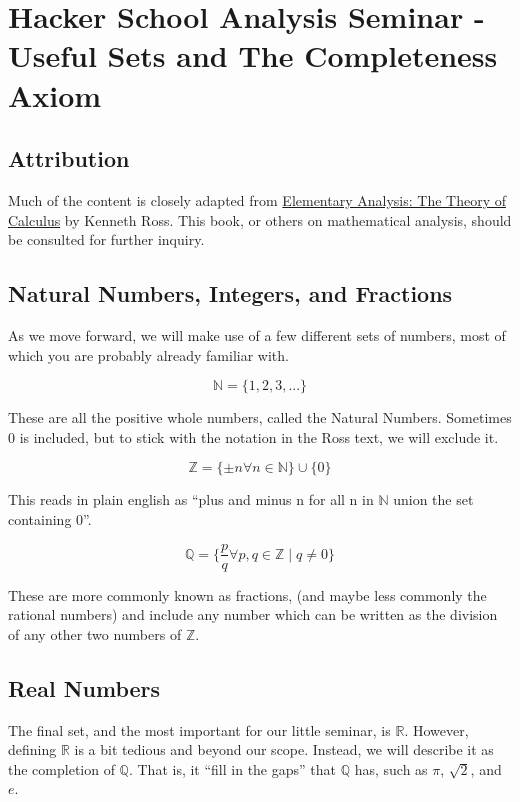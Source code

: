 \documentclass[]{article}
\author{}
\date{}
\begin{document}
\section{Hacker School Analysis Seminar - Useful Sets and The
Completeness Axiom}

\subsection{Attribution}

Much of the content is closely adapted from
\href{http://books.google.com/books/about/Elementary_Analysis.html?id=ZDaSnKr_k5sC}{Elementary
Analysis: The Theory of Calculus} by Kenneth Ross. This book, or others
on mathematical analysis, should be consulted for further inquiry.

\subsection{Natural Numbers, Integers, and Fractions}

As we move forward, we will make use of a few different sets of numbers,
most of which you are probably already familiar with.

\[ \mathbb{N} = \{1,2,3,...\} \]

These are all the positive whole numbers, called the Natural Numbers.
Sometimes $0$ is included, but to stick with the notation in the Ross
text, we will exclude it.

\[ \mathbb{Z} = \{\pm n \forall n \in \mathbb{N} \} \cup \{0\} \]

This reads in plain english as ``plus and minus n for all n in
$\mathbb{N}$ union the set containing 0''.

\[ \mathbb{Q} = \{\frac{p}{q} \forall p,q \in \mathbb{Z} \mid q \ne 0 \} \]

These are more commonly known as fractions, (and maybe less commonly the
rational numbers) and include any number which can be written as the
division of any other two numbers of $\mathbb{Z}$.

\subsection{Real Numbers}

The final set, and the most important for our little seminar, is
$\mathbb{R}$. However, defining $\mathbb{R}$ is a bit tedious and beyond
our scope. Instead, we will describe it as the completion of
$\mathbb{Q}$. That is, it ``fill in the gaps'' that $\mathbb{Q}$ has,
such as $\pi$, $\sqrt{2}$, and $e$.
\end{document}

